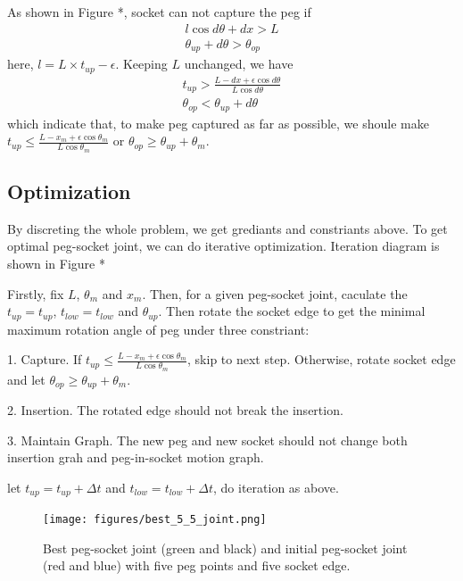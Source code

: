 As shown in Figure *, socket can not capture the peg if
\begin{eqnarray}
l\cos{d\theta} + dx > L\\
\theta_{up} + {d\theta} > \theta_{op}
\end{eqnarray}
here, ${l}={L}\times{t}_{up}-\epsilon$. Keeping ${L}$ unchanged, we have 
\begin{eqnarray}
{t}_{up}>\frac{L-dx+\epsilon\cos{d\theta}}{L\cos{d\theta}}\\
\theta_{op}<\theta_{up} + {d\theta}
\end{eqnarray}
which indicate that, to make peg captured as far as possible, we shoule make 
${t}_{up}\le\frac{L-x_m+\epsilon\cos\theta_m}{L\cos{\theta}_m}$ or $\theta_{op}\ge\theta_{up} + {\theta_m}$. 


\subsection{Optimization}

By discreting the whole problem, we get grediants and constriants above. To get optimal peg-socket joint, we can do iterative optimization. Iteration diagram is shown in Figure *

Firstly, fix ${L}$, ${\theta_m}$ and ${x_m}$. Then, for a given peg-socket joint, caculate the ${t}_{up}={t}_{up}$, ${t}_{low}={t}_{low}$ and $\theta_{up}$. Then rotate the socket edge to get the minimal maximum rotation angle of peg under three constriant:

1. Capture. If ${t}_{up}\le\frac{L-x_m+\epsilon\cos\theta_m}{L\cos{\theta}_m}$, skip to next step. Otherwise, rotate socket edge and let $\theta_{op}\ge\theta_{up} + {\theta_m}$.

2. Insertion. The rotated edge should not break the insertion.

3. Maintain Graph. The new peg and new socket should not change both insertion grah and peg-in-socket motion graph.

let ${t}_{up}={t}_{up}+\Delta{t}$ and ${t}_{low}={t}_{low}+\Delta{t}$, do iteration as above.

\begin{figure}
\begin{center}
\texttt{[image: figures/best\_5\_5\_joint.png]}
\end{center}
\caption{Best peg-socket joint (green and black) and initial peg-socket joint (red and blue) with five peg points and five socket edge. }
\label{fig:best_5_5_joint}
\end{figure}


